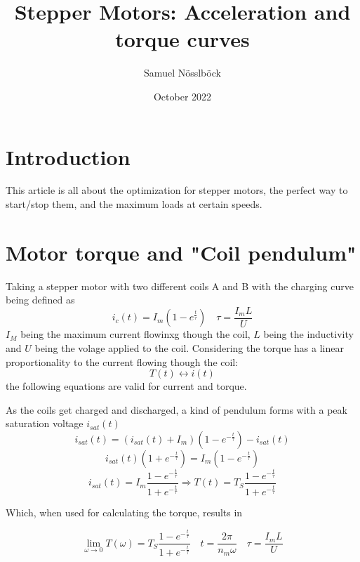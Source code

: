 \documentclass{article}
\title{Stepper Motors: Acceleration and torque curves}
\author{Samuel Nösslböck}
\date{October 2022}
\begin{document}
\maketitle

\section{Introduction}

    This article is all about the optimization for stepper motors, the perfect way to start/stop them, and the maximum loads at certain speeds.

\section{Motor torque and "Coil pendulum"}

    Taking a stepper motor with two different coils A and B with the charging curve being defined as
    \begin{equation}
        i_c(t) = I_{m} (1 - e^{\frac{t}{\tau}}) \quad \tau = \frac{I_{m}L}{U}
    \end{equation}
    $I_M$ being the maximum current flowinxg though the coil, $L$ being the inductivity and $U$ being the volage applied to the coil.
    Considering the torque has a linear proportionality to the current flowing though the coil:
    \[
        T(t) \leftrightarrow i(t)
    \]
    the following equations are valid for current and torque.

    As the coils get charged and discharged, a kind of pendulum forms with a peak saturation voltage $i_{sat}(t)$
    \[
        i_{sat}(t) = (i_{sat}(t) + I_m)(1 - e^{-\frac{t}{\tau}}) - i_{sat}(t)
    \]\[
        i_{sat}(t)(1 + e^{-\frac{t}{\tau}}) = I_{m}(1 - e^{-\frac{t}{\tau}})
    \]
    \begin{equation}
        i_{sat}(t) = I_m \frac{1 - e^{-\frac{t}{\tau}}}{1 + e^{-\frac{t}{\tau}}} \Rightarrow
        T(t) = T_S \frac{1 - e^{-\frac{t}{\tau}}}{1 + e^{-\frac{t}{\tau}}}
    \end{equation}

    Which, when used for calculating the torque, results in 

    \begin{equation}
        \lim_{\omega \rightarrow 0}
        T(\omega) = T_S \frac{1 - e^{-\frac{t}{\tau}}}{1 + e^{-\frac{t}{\tau}}} \quad 
        t = \frac{2\pi}{n_m\omega} \quad
        \tau = \frac{I_{m}L}{U}
    \end{equation}
\end{document}
